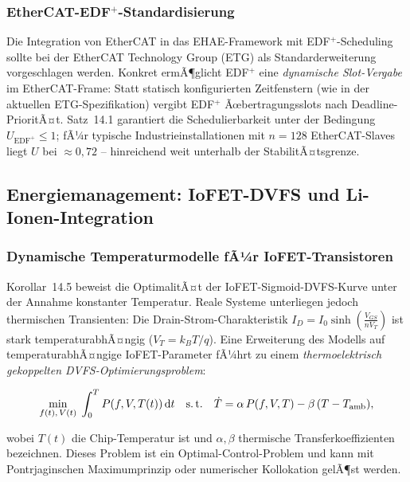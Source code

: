 ﻿\documentclass[a4paper,12pt]{scrreprt}
\theoremstyle{definition}
\begin{document}
	\subsubsection{EtherCAT-EDF\texorpdfstring{$^+$}{+}-Standardisierung}
	
	Die Integration von EtherCAT \cite{IEC61158} in das EHAE-Framework
	\cite{Epp2026ethercate} mit EDF$^+$-Scheduling sollte bei der
	EtherCAT Technology Group (ETG) als Standarderweiterung vorgeschlagen werden.
	Konkret ermÃ¶glicht EDF$^+$ eine \emph{dynamische Slot-Vergabe} im
	EtherCAT-Frame: Statt statisch konfigurierten Zeitfenstern (wie in
	der aktuellen ETG-Spezifikation) vergibt EDF$^+$ Ãœbertragungsslots
	nach Deadline-PrioritÃ¤t. Satz~14.1 garantiert die Schedulierbarkeit
	unter der Bedingung $U_{\mathrm{EDF}^+} \le 1$; fÃ¼r typische
	Industrieinstallationen mit $n = 128$ EtherCAT-Slaves liegt
	$U$ bei $\approx 0{,}72$ -- hinreichend weit unterhalb der
	StabilitÃ¤tsgrenze.
	
	\subsection{Energiemanagement: IoFET-DVFS und Li-Ionen-Integration}
	
	\subsubsection{Dynamische Temperaturmodelle fÃ¼r IoFET-Transistoren}
	
	Korollar~14.5 beweist die OptimalitÃ¤t der IoFET-Sigmoid-DVFS-Kurve
	unter der Annahme konstanter Temperatur. Reale Systeme unterliegen
	jedoch thermischen Transienten: Die Drain-Strom-Charakteristik
	$I_D = I_0 \sinh\!\left(\frac{V_{GS}}{nV_T}\right)$ ist stark temperaturabhÃ¤ngig
	($V_T = k_BT/q$). Eine Erweiterung des Modells \cite{Epp2026iono}
	auf temperaturabhÃ¤ngige IoFET-Parameter fÃ¼hrt zu einem
	\emph{thermoelektrisch gekoppelten DVFS-Optimierungsproblem}:
	
	\[
	\min_{f(t),\, V(t)}\; \int_0^T P(f,V,T(t))\,\mathrm{d}t
	\quad\text{s.\,t.}\quad
	\dot{T} = \alpha\, P(f,V,T) - \beta\,(T - T_{\mathrm{amb}}),
	\]
	
	wobei $T(t)$ die Chip-Temperatur ist und $\alpha, \beta$ thermische
	Transferkoeffizienten bezeichnen. Dieses Problem ist ein Optimal-Control-Problem
	und kann mit Pontrjaginschen Maximumprinzip oder numerischer
	Kollokation gelÃ¶st werden.
	
\end{document}
